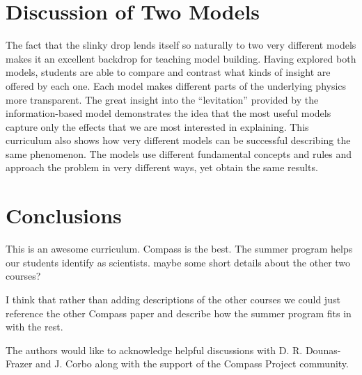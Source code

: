 \documentclass[aps,pre,10pt,superscriptaddress,showpacs,amsmath,amssymb,nofootinbib]{revtex4-1}
\begin{document}
\section{Discussion of Two Models}
\label{sec:discussion}

The fact that the slinky drop lends itself so naturally to two very different models
makes it an excellent backdrop for teaching model building. Having explored both
models, students are able to compare and contrast what kinds of insight are
offered by each one. Each model makes different parts of the underlying physics
more transparent. The great insight into the ``levitation'' provided by the
information-based model demonstrates the idea that the most useful models
capture only the effects that we are most interested in explaining. This curriculum
also shows how very different models can be successful describing the same
phenomenon. The models use different fundamental concepts and rules and approach
the problem in very different ways, yet obtain the same results. 

\section{Conclusions}
This is an awesome curriculum.  Compass is the best.  The summer program helps
our students identify as scientists.  maybe some short details about the other
two courses?

I think that rather than adding descriptions of the other courses we could just
reference the other Compass paper and describe how the summer program fits in 
with the rest.


\acknowledgments The authors would like to acknowledge helpful discussions with
D. R. Dounas-Frazer and J. Corbo along with the support of the Compass Project
community.


\end{document}
